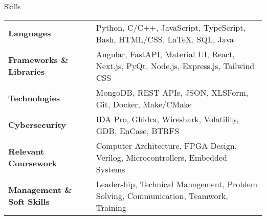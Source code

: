 \documentclass{resume} %
\date{\today}
\begin{document}
\begin{rSection}{Skills}

\begin{tabular}{ @{} >{\bfseries}l @{\hspace{5ex}} l }
Languages \ & Python, C/C++, JavaScript, TypeScript, Bash, HTML/CSS, \LaTeX, SQL, Java \\
Frameworks \& Libraries \ & Angular, FastAPI, Material UI, React, Next.js, PyQt, Node.js, Express.js, Tailwind CSS \\
Technologies \ & MongoDB, REST APIs, JSON, XLSForm, Git, Docker, Make/CMake \\
Cybersecurity \ & IDA Pro, Ghidra, Wireshark, Volatility, GDB, EnCase, BTRFS \\
Relevant Coursework \ & Computer Architecture, FPGA Design, Verilog, Microcontrollers, Embedded Systems \\
Management \& Soft Skills \ & Leadership, Technical Management, Problem Solving, Communication, Teamwork, Training \\
\end{tabular}
\end{rSection}
\end{document}
